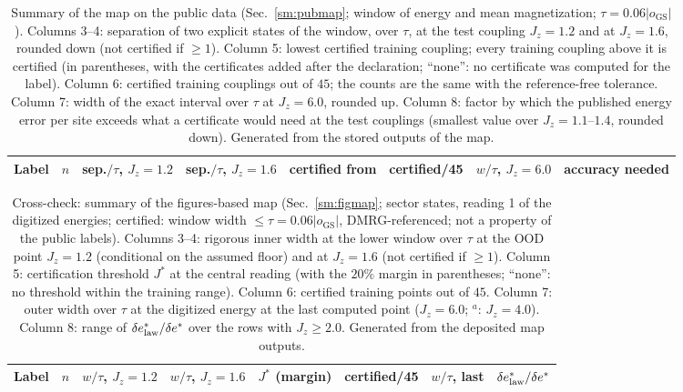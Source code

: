 \documentclass[aps,prx,onecolumn,10pt,nofootinbib,longbibliography,floatfix]{revtex4-2}
\theoremstyle{remark}
\newcommand{\Jz}{J_z}
\newcommand{\des}{\delta e^{*}}
\newcommand{\GS}{\mathrm{GS}}
\begin{document}
\begin{table}[h]
\caption{\label{tabS:pubmap}Summary of the map on the public data (Sec.~\ref{sm:pubmap}; window of energy and mean %
magnetization; $\tau=0.06|o_\GS|$). Columns 3--4: separation of two explicit states of the window, over $\tau$, at the %
test coupling $\Jz=1.2$ and at $\Jz=1.6$, rounded down (not certified if $\ge1$). Column 5: lowest certified training
coupling; every training coupling above it is certified (in parentheses, with the certificates added after the
declaration; ``none'': no certificate was computed for the label). Column 6: certified training couplings out of $45$;
the counts are the same with the reference-free tolerance. Column 7: width of the exact interval over $\tau$ at
$\Jz=6.0$, rounded up. Column 8: factor by which the published energy error per site exceeds what a certificate
would need at the test couplings (smallest value over $\Jz=1.1$--$1.4$, rounded down). Generated from the stored
outputs of the map.}
\begin{ruledtabular}
\begin{tabular}{llcccccc}
Label & $n$ & sep.$/\tau$, $\Jz=1.2$ & sep.$/\tau$, $\Jz=1.6$ & certified from & certified/45 & $w/\tau$, $\Jz=6.0$ & accuracy needed \\
\hline

\end{tabular}
\end{ruledtabular}
\end{table}

\begin{table}[h]
\caption{\label{tabS:map}Cross-check: summary of the figures-based map (Sec.~\ref{sm:figmap}; sector states, reading 1 %
of the digitized energies; certified: window width $\le\tau=0.06|o_\GS|$, DMRG-referenced; not a property of the %
public labels). Columns 3--4: rigorous inner width at the lower window
over $\tau$ at the OOD point $\Jz=1.2$ (conditional on the assumed floor) and at $\Jz=1.6$ (not certified if $\ge1$). Column 5:
certification threshold $J^*$ at the central reading (with the $20\%$ margin in parentheses; ``none'': no threshold %
within the training range). Column 6: certified training points out of $45$. Column 7: outer width over $\tau$ at the
digitized energy at the last computed point ($\Jz=6.0$; $^a$: $\Jz=4.0$). Column 8: range of $\des_{\rm law}/\des$
over the rows with $\Jz\ge2.0$. Generated from the deposited map outputs.}
\begin{ruledtabular}
\begin{tabular}{llcccccc}
Label & $n$ & $w/\tau$, $\Jz=1.2$ & $w/\tau$, $\Jz=1.6$ & $J^*$ (margin) & certified/45 & $w/\tau$, last & $\des_{\rm law}/\des$ \\
\hline

\end{tabular}
\end{ruledtabular}
\end{table}
\end{document}

